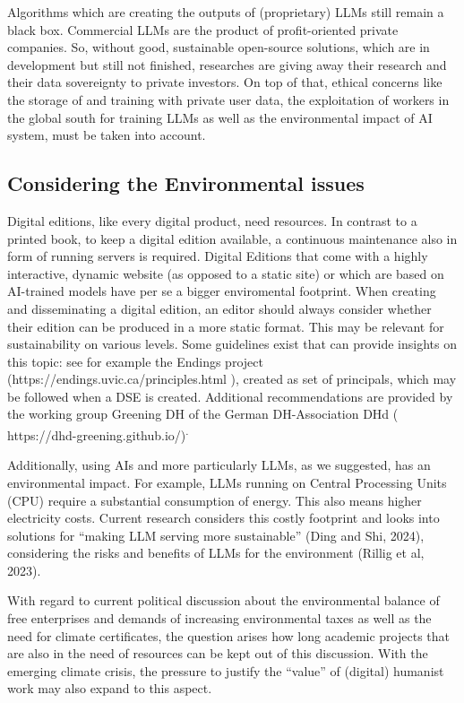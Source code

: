 \documentclass[
  letterpaper,
  DIV=11,
  numbers=noendperiod]{scrreprt}
\begin{document}
Algorithms which are creating the outputs of (proprietary) LLMs still
remain a black box. Commercial LLMs are the product of profit-oriented
private companies. So, without good, sustainable open-source solutions,
which are in development but still not finished, researches are giving
away their research and their data sovereignty to private investors. On
top of that, ethical concerns like the storage of and training with
private user data, the exploitation of workers in the global south for
training LLMs as well as the environmental impact of AI system, must be
taken into account.

\subsection{Considering the Environmental
issues}\label{considering-the-environmental-issues}

Digital editions, like every digital product, need resources. In
contrast to a printed book, to keep a digital edition available, a
continuous maintenance also in form of running servers is required.
Digital Editions that come with a highly interactive, dynamic website
(as opposed to a static site) or which are based on AI-trained models
have per se a bigger enviromental footprint. When creating and
disseminating a digital edition, an editor should always consider
whether their edition can be produced in a more static format. This may
be relevant for sustainability on various levels. Some guidelines exist
that can provide insights on this topic: see for example the Endings
project (https://endings.uvic.ca/principles.html ), created as set of
principals, which may be followed when a DSE is created. Additional
recommendations are provided by the working group Greening DH of the
German DH-Association DHd (
https://dhd-greening.github.io/)\textsuperscript{.}

Additionally, using AIs and more particularly LLMs, as we suggested, has
an environmental impact. For example, LLMs running on Central Processing
Units (CPU) require a substantial consumption of energy. This also means
higher electricity costs. Current research considers this costly
footprint and looks into solutions for ``making LLM serving more
sustainable'' (Ding and Shi, 2024), considering the risks and benefits
of LLMs for the environment (Rillig et al, 2023).

With regard to current political discussion about the environmental
balance of free enterprises and demands of increasing environmental
taxes as well as the need for climate certificates, the question arises
how long academic projects that are also in the need of resources can be
kept out of this discussion. With the emerging climate crisis, the
pressure to justify the ``value'' of (digital) humanist work may also
expand to this aspect.
\end{document}
